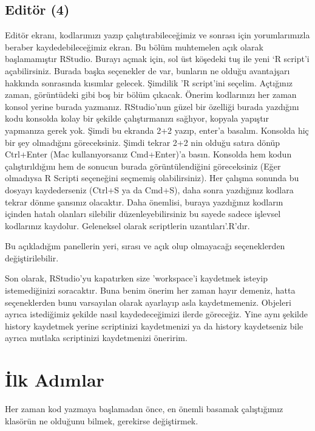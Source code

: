 \documentclass[
]{book}
\begin{document}
\hypertarget{edituxf6r-4}{%
\section{Editör (4)}\label{edituxf6r-4}}

Editör ekranı, kodlarımızı yazıp çalıştırabileceğimiz ve sonrası için yorumlarımızla beraber kaydedebileceğimiz ekran. Bu bölüm muhtemelen açık olarak başlamamıştır RStudio. Burayı açmak için, sol üst köşedeki tuş ile yeni `R script'i açabilirsiniz. Burada başka seçenekler de var, bunların ne olduğu avantajşarı hakkında sonrasında kısımlar gelecek. Şimdilik 'R script'ini seçelim. Açtığınız zaman, görüntüdeki gibi boş bir bölüm çıkacak. Önerim kodlarınızı her zaman konsol yerine burada yazmanız. RStudio'nun güzel bir özelliği burada yazdığını kodu konsolda kolay bir şekilde çalıştırmanızı sağlıyor, kopyala yapıştır yapmanıza gerek yok. Şimdi bu ekranda 2+2 yazıp, enter'a basalım. Konsolda hiç bir şey olmadığını göreceksiniz. Şimdi tekrar 2+2 nin olduğu satıra dönüp Ctrl+Enter (Mac kullanıyorsanız Cmd+Enter)'a basın. Konsolda hem kodun çalıştırıldığını hem de sonucun burada görüntülendiğini göreceksiniz (Eğer olmadıysa R Scripti seçeneğini seçmemiş olabilirsiniz). Her çalışma sonunda bu dosyayı kaydederseniz (Ctrl+S ya da Cmd+S), daha sonra yazdığınız kodlara tekrar dönme şansınız olacaktır. Daha önemlisi, buraya yazdığınız kodların içinden hatalı olanları silebilir düzenleyebilirsiniz bu sayede sadece işlevsel kodlarınız kaydolur. Geleneksel olarak scriptlerin uzantıları'.R'dır.

Bu açıkladığım panellerin yeri, sırası ve açık olup olmayacağı seçeneklerden değiştirilebilir.

Son olarak, RStudio'yu kapatırken size 'workspace'i kaydetmek isteyip istemediğinizi soracaktır. Buna benim önerim her zaman hayır demeniz, hatta seçeneklerden bunu varsayılan olarak ayarlayıp asla kaydetmemeniz. Objeleri ayrıca istediğimiz şekilde nasıl kaydedeceğimizi ilerde göreceğiz. Yine aynı şekilde history kaydetmek yerine scriptinizi kaydetmenizi ya da history kaydetseniz bile ayrıca mutlaka scriptinizi kaydetmenizi öneririm.

\hypertarget{ilkadimlar}{%
\chapter{İlk Adımlar}\label{ilkadimlar}}

Her zaman kod yazmaya başlamadan önce, en önemli basamak çalıştığımız klasörün ne olduğunu bilmek, gerekirse değiştirmek.
\end{document}
